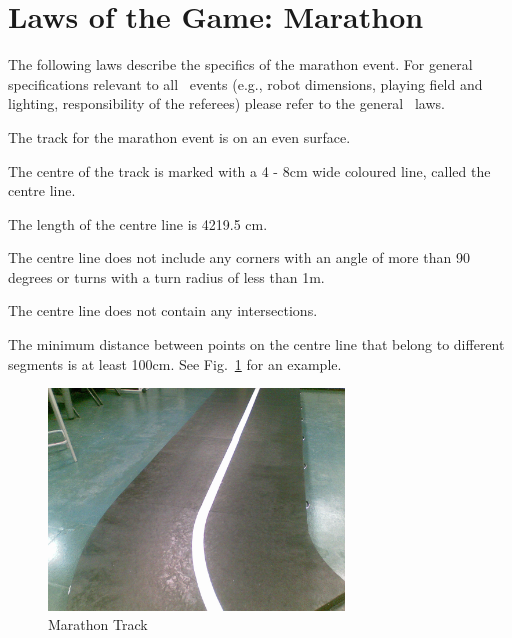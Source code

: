 \documentclass[12pt]{hurocup}
\begin{document}
\section{Laws of the Game: Marathon}
\label{sec:marathon-laws}

The following laws describe the specifics of the marathon
event. For general specifications relevant to all \HuroCup\ events
(e.g., robot dimensions, playing field and lighting, responsibility of
the referees) please refer to the general \HuroCup\ laws.

\label{mr-field}

\begin{lawlist}[MR]

\item The track for the marathon event is on an even surface.

\item The centre of the track is marked with a 4 - 8cm wide coloured
line, called the centre line.

\item The length of the centre line is 4219.5 cm.

\item The centre line does not include any corners with an
 angle of more than 90 degrees or turns with a turn radius of less
 than 1m.

\item The centre line does not contain any intersections.

\item The minimum distance between points on the centre line that
 belong to different segments is at least 100cm.  See
 Fig.~\ref{fig:marathon-track} for an example.

\begin{figure}
  \begin{center}
    \includegraphics[width=0.7\textwidth]{Figures/marathon-track}
  \end{center}
  \caption{Marathon Track}
  \label{fig:marathon-track}
\end{figure}

\end{lawlist}
\end{document}
